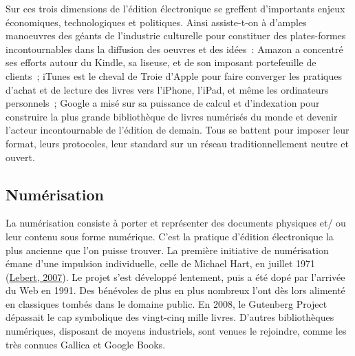 \documentclass[12pt,french,letterpaper,]{article}
\begin{document}
Sur ces trois dimensions de l'édition électronique se greffent
d'importants enjeux économiques, technologiques et politiques. Ainsi
assiste-t-on à d'amples manoeuvres des géants de l'industrie culturelle
pour constituer des plates-formes incontournables dans la diffusion des
oeuvres et des idées~: Amazon a concentré ses efforts autour du Kindle,
sa liseuse, et de son imposant portefeuille de clients~; iTunes est le
cheval de Troie d'Apple pour faire converger les pratiques d'achat et de
lecture des livres vers l'iPhone, l'iPad, et même les ordinateurs
personnels~; Google a misé sur sa puissance de calcul et d'indexation
pour construire la plus grande bibliothèque de livres numérisés du monde
et devenir l'acteur incontournable de l'édition de demain. Tous se
battent pour imposer leur format, leurs protocoles, leur standard sur un
réseau traditionnellement neutre et ouvert.

\hypertarget{numuxe9risation}{%
\subsection{Numérisation}\label{numuxe9risation}}

La numérisation consiste à porter et représenter des documents physiques
et/ ou leur contenu sous forme numérique. C'est la pratique d'édition
électronique la plus ancienne que l'on puisse trouver. La première
initiative de numérisation émane d'une impulsion individuelle, celle de
Michael Hart, en juillet 1971
(\protect\hyperlink{ref-lebert_les_2007}{Lebert, 2007}). Le projet s'est
développé lentement, puis a été dopé par l'arrivée du Web en 1991. Des
bénévoles de plus en plus nombreux l'ont dès lors alimenté en classiques
tombés dans le domaine public. En 2008, le Gutenberg Project dépassait
le cap symbolique des vingt-cinq mille livres. D'autres bibliothèques
numériques, disposant de moyens industriels, sont venues le rejoindre,
comme les très connues Gallica et Google Books.
\end{document}
